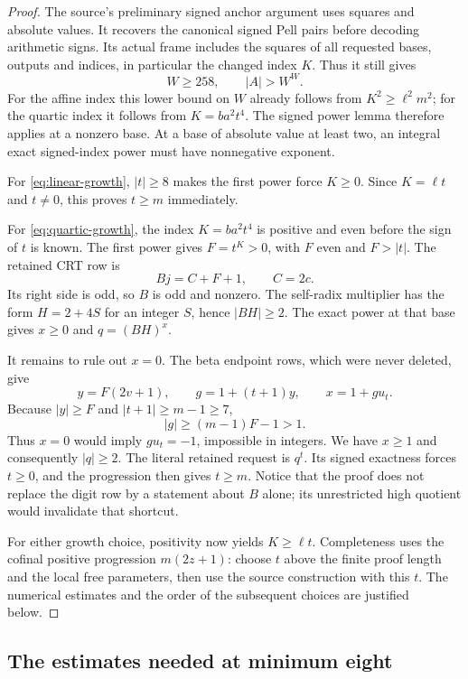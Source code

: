 \begin{proof}
The source's preliminary signed anchor argument uses squares and
absolute values. It recovers the canonical signed Pell pairs before
decoding arithmetic signs. Its actual frame includes the squares of
all requested bases, outputs and indices, in particular the changed
index $K$. Thus it still gives
\[
 W\ge258,\qquad |A|>W^W.
\]
For the affine index this lower bound on $W$ already follows from
$K^2\ge\ell^2m^2$; for the quartic index it follows from
$K=ba^2t^4$. The signed power lemma therefore applies at a nonzero
base. At a base of absolute value at least two, an integral exact
signed-index power must have nonnegative exponent.

For \eqref{eq:linear-growth}, $|t|\ge8$ makes the first power
force $K\ge0$. Since $K=\ell t$ and $t\ne0$, this proves $t\ge m$
immediately.

For \eqref{eq:quartic-growth}, the index $K=ba^2t^4$ is positive
and even before the sign of $t$ is known. The first power gives
$F=t^K>0$, with $F$ even and $F>|t|$. The retained CRT row is
\[
 Bj=C+F+1,\qquad C=2c.
\]
Its right side is odd, so $B$ is odd and nonzero. The self-radix
multiplier has the form $H=2+4S$ for an integer $S$, hence
$|BH|\ge2$. The exact power at that base gives
$x\ge0$ and $q=(BH)^x$.

It remains to rule out $x=0$. The beta endpoint rows, which were
never deleted, give
\[
 y=F(2v+1),\qquad g=1+(t+1)y,\qquad x=1+gu_t.
\]
Because $|y|\ge F$ and $|t+1|\ge m-1\ge7$,
\[
 |g|\ge(m-1)F-1>1.
\]
Thus $x=0$ would imply $gu_t=-1$, impossible in integers.
We have $x\ge1$ and consequently $|q|\ge2$. The literal retained
request is $q^t$. Its signed exactness forces $t\ge0$, and the
progression then gives $t\ge m$. Notice that the proof does not
replace the digit row by a statement about $B$ alone; its unrestricted
high quotient would invalidate that shortcut.

For either growth choice, positivity now yields $K\ge\ell t$.
Completeness uses the cofinal positive progression $m(2z+1)$:
choose $t$ above the finite proof length and the local free parameters,
then use the source construction with this $t$. The numerical
estimates and the order of the subsequent choices are justified below.
\end{proof}

\subsection{The estimates needed at minimum eight}


